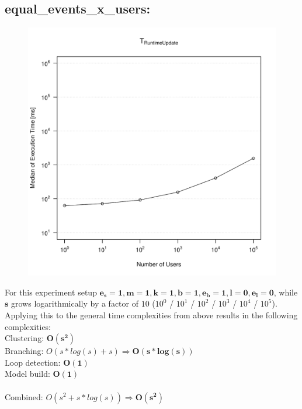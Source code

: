 \documentclass[10pt,a4paper]{article}
\begin{document}
	\subsection{equal\_events\_x\_users:}
	\begin{figure}[H]
		\centering
		\includegraphics[scale=0.7]{graphics/TRuntimeUpdate_median_equal_events.pdf}
	\end{figure}
	For this experiment setup $\mathbf{e_s = 1, m = 1, k = 1, b = 1, e_b = 1, l = 0, e_l = 0}$, while $\mathbf{s}$ grows logarithmically by a factor of $10$ ($10^0$ / $10^1$ / $10^2$ / $10^3$ / $10^4$ / $10^5$). Applying this to the general time complexities from above results in the following complexities:\\
	Clustering: $\mathbf{O(s^2)}$\\
	Branching: $O(s * log(s) + s) \Rightarrow \mathbf{O(s * log(s))}$\\
	Loop detection: $\mathbf{O(1)}$\\
	Model build: $\mathbf{O(1)}$\\
	\\
	Combined: $O(s^2 + s * log(s)) \Rightarrow \mathbf{O(s^2)}$\\
	
\end{document}
